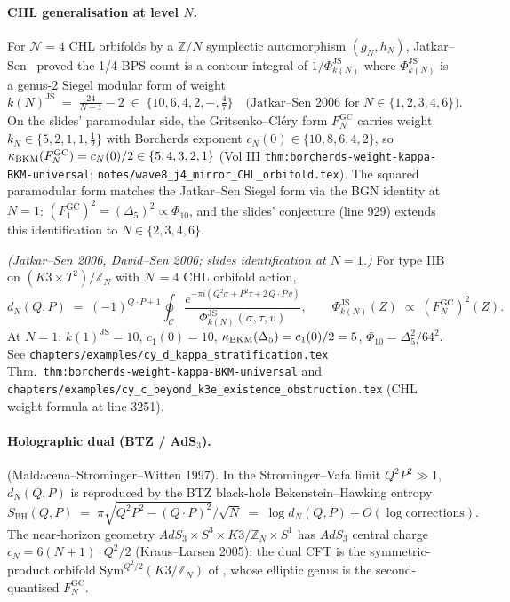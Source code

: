 \paragraph{CHL generalisation at level $N$.}
For $\mathcal{N}=4$ CHL orbifolds \cite{CHL1995} by a $\mathbb{Z}/N$
symplectic automorphism $(g_N,h_N)$, Jatkar--Sen~\cite{JatkarSen2006}
proved the 1/4-BPS count is a contour integral of
$1/\Phi_{k(N)}^{\mathrm{JS}}$ where $\Phi_{k(N)}^{\mathrm{JS}}$ is a
genus-2 Siegel modular form of weight
\[
k(N)^{\mathrm{JS}} \;=\; \tfrac{24}{N+1}-2
\;\in\;\{10,6,4,2,-,\tfrac{4}{7}\}
\quad\text{(Jatkar--Sen 2006 for $N\in\{1,2,3,4,6\}$)}.
\]
On the slides' paramodular side, the Gritsenko--Cl\'ery form
$F^{\mathrm{GC}}_N$ carries weight
$k_N\in\{5,2,1,1,\tfrac12\}$ with Borcherds exponent
$c_N(0)\in\{10,8,6,4,2\}$, so $\kappa_{\mathrm{BKM}}(F^{\mathrm{GC}}_N)=c_N(0)/2\in
\{5,4,3,2,1\}$ (Vol III
\texttt{thm:borcherds-weight-kappa-BKM-universal};
\texttt{notes/wave8\_j4\_mirror\_CHL\_orbifold.tex}). The squared
paramodular form matches the Jatkar--Sen Siegel form via the BGN
identity at $N=1$: $(F^{\mathrm{GC}}_1)^2 = (\Delta_5)^2 \propto
\Phi_{10}$, and the slides' conjecture (line 929) extends this
identification to $N\in\{2,3,4,6\}$.

\begin{theorem}
\ClaimStatusTheorem{} \emph{(Jatkar--Sen 2006, David--Sen 2006; slides
identification at $N=1$.)} For type IIB on $(K3\times T^2)/\mathbb{Z}_N$
with $\mathcal{N}=4$ CHL orbifold action,
\[
d_N(Q,P) \;=\; (-1)^{Q\cdot P+1} \oint_{\mathcal{C}}
\frac{e^{-\pi i (Q^2\sigma + P^2\tau + 2\,Q\!\cdot\! P\,v)}}
{\Phi^{\mathrm{JS}}_{k(N)}(\sigma,\tau,v)},
\qquad
\Phi^{\mathrm{JS}}_{k(N)}(Z) \;\propto\; (F^{\mathrm{GC}}_N)^{2}(Z).
\]
At $N=1$: $k(1)^{\mathrm{JS}}=10$, $c_1(0)=10$,
$\kappa_{\mathrm{BKM}}(\Delta_5)=c_1(0)/2=5$, $\Phi_{10}=\Delta_5^2/64^2$. See
\texttt{chapters/examples/cy\_d\_kappa\_stratification.tex}
Thm.\ \texttt{thm:borcherds-weight-kappa-BKM-universal} and
\texttt{chapters/examples/cy\_c\_beyond\_k3e\_existence\_obstruction.tex}
(CHL weight formula at line 3251).
\end{theorem}

\paragraph{Holographic dual (BTZ / AdS$_3$).}
\ClaimStatusTheorem{} (Maldacena--Strominger--Witten 1997).
In the Strominger--Vafa limit $Q^2 P^2 \gg 1$, $d_N(Q,P)$
is reproduced by the BTZ black-hole Bekenstein--Hawking entropy
\[
S_{\mathrm{BH}}(Q,P) \;=\; \pi\sqrt{Q^2 P^2-(Q\cdot P)^2}/\sqrt{N}
\;=\; \log d_N(Q,P) + O(\log\text{corrections}).
\]
The near-horizon geometry $AdS_3\times S^3\times K3/\mathbb{Z}_N
\times S^1$ has $AdS_3$ central charge $c_N = 6(N+1)\cdot Q^2/2$
(Kraus--Larsen 2005); the dual CFT is the symmetric-product orbifold
$\mathrm{Sym}^{Q^2/2}(K3/\mathbb{Z}_N)$ of
\cite{DMVV1997}, whose elliptic genus is the second-quantised
$F^{\mathrm{GC}}_N$.

